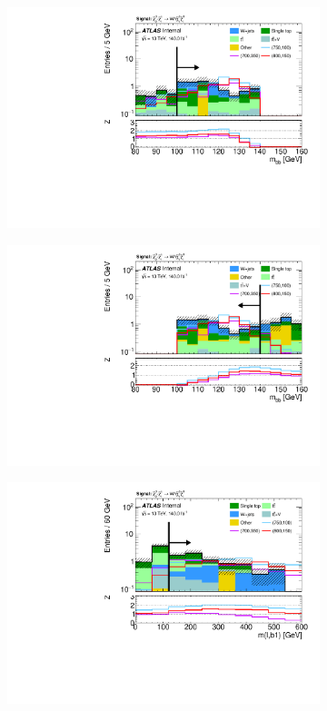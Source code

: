 \begin{figure}
\begin{subfigure}[b]{0.4\linewidth}
		\centering\includegraphics[width=\textwidth]{n1_SRHM_mct_bins/mbb_lower.pdf}
		\caption{\label{fig:Wh_reopt_second_round_n1_srhm_mbb_lower}}
	\end{subfigure}%
	\begin{subfigure}[b]{0.4\linewidth}
		\centering\includegraphics[width=\textwidth]{n1_SRHM_mct_bins/mbb_upper.pdf}
		\caption{\label{fig:Wh_reopt_second_round_n1_srhm_mbb_upper}}
	\end{subfigure}
	\begin{subfigure}[b]{0.4\linewidth}
		\centering\includegraphics[width=\textwidth]{n1_SRHM_mct_bins/mlb1.pdf}

\end{subfigure}
\end{figure}
